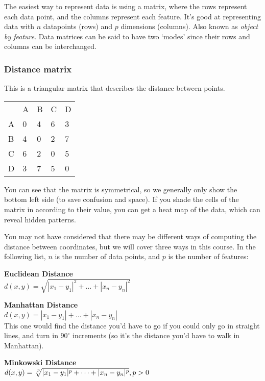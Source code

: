 The easiest way to represent data is using a matrix, where the rows represent
each data point, and the columns represent each feature. It's good at
representing data with $n$ datapoints (rows) and $p$ dimensions (columns). Also
known as \textit{object by feature}. Data matrices can be said to have two
`modes' since their rows and columns can be interchanged.

\subsubsection{Distance matrix}

This is a triangular matrix that describes the distance between points.

\begin{center}
  \begin{tabular}{lllll}
      & A & B & C & D\\
    A & 0 & 4 & 6 & 3\\
    B & 4 & 0 & 2 & 7\\
    C & 6 & 2 & 0 & 5\\
    D & 3 & 7 & 5 & 0
  \end{tabular}
\end{center}

You can see that the matrix is symmetrical, so we generally only show the bottom
left side (to save confusion and space). If you shade the cells of the matrix in
according to their value, you can get a heat map of the data, which can reveal
hidden patterns.

You may not have considered that there may be different ways of computing the
distance between coordinates, but we will cover three ways in this course. In
the following list, $n$ is the number of data points, and $p$ is the number of
features:

\begin{description}
  \item \textbf{Euclidean Distance}\\ 
    $d(x,y) = \sqrt{|x_1 - y_1|^2 + \dots + |x_n - y_n|^2}$
  \item \textbf{Manhattan Distance}\\
    $d(x,y) = |x_1 - y_1| + \dots + |x_n - y_n|$\\
    This one would find the distance you'd have to go if you could only go in
    straight lines, and turn in $90^{\circ}$ increments (so it's the distance
    you'd have to walk in Manhattan).
  \item \textbf{Minkowski Distance}\\
    $d(x,y) = \sqrt[\leftroot{-2}\uproot{2}p]{|x_1 - y_1|^p + \dots + |x_n - y_n|^p}, p > 0$
\end{description}

